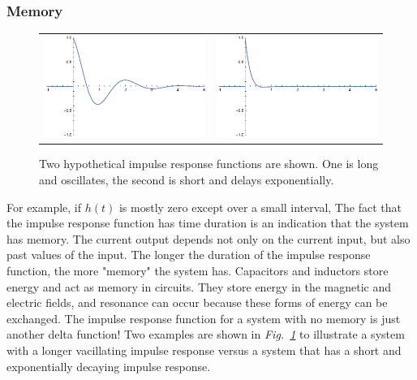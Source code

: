 \subsubsection{Memory}
\begin{figure}[tb]
\begin{tabular}{cc}
\includegraphics[width=.4\columnwidth]{impulse1_long.pdf} &
\includegraphics[width=.4\columnwidth]{impulse2_short.pdf} \\
\end{tabular}
\caption{Two hypothetical impulse response functions are shown.  One is long and oscillates, the second is short and delays exponentially.}
\label{fig:memory}
\end{figure}
For example, if $h(t)$ is mostly zero except over a small interval, 
The fact that the impulse response function has time duration is an indication that the system has memory.  The current output depends not only on the current input, but also past values of the input.  The longer the duration of the impulse response function, the more "memory" the system has.  Capacitors and inductors store energy and act as memory in circuits.  They store energy in the magnetic and electric fields, and resonance can occur because these forms of energy can be exchanged.  The impulse response function for a system with no memory is just another delta function!  Two examples are shown in \emph{Fig.~\ref{fig:memory}} to illustrate a system with a longer vacillating impulse response versus a system that has a short and exponentially decaying impulse response.  

